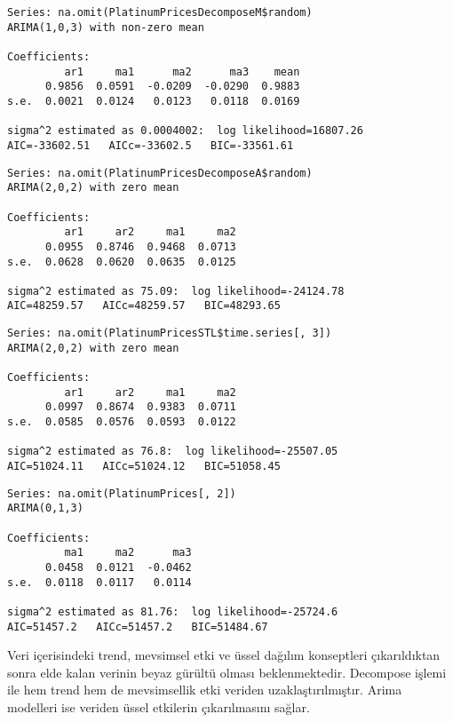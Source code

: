 \documentclass[11pt]{article}
\begin{document}
    
    \begin{verbatim}
Series: na.omit(PlatinumPricesDecomposeM$random) 
ARIMA(1,0,3) with non-zero mean 

Coefficients:
         ar1     ma1      ma2      ma3    mean
      0.9856  0.0591  -0.0209  -0.0290  0.9883
s.e.  0.0021  0.0124   0.0123   0.0118  0.0169

sigma^2 estimated as 0.0004002:  log likelihood=16807.26
AIC=-33602.51   AICc=-33602.5   BIC=-33561.61
    \end{verbatim}

    
    
    \begin{verbatim}
Series: na.omit(PlatinumPricesDecomposeA$random) 
ARIMA(2,0,2) with zero mean 

Coefficients:
         ar1     ar2     ma1     ma2
      0.0955  0.8746  0.9468  0.0713
s.e.  0.0628  0.0620  0.0635  0.0125

sigma^2 estimated as 75.09:  log likelihood=-24124.78
AIC=48259.57   AICc=48259.57   BIC=48293.65
    \end{verbatim}

    
    
    \begin{verbatim}
Series: na.omit(PlatinumPricesSTL$time.series[, 3]) 
ARIMA(2,0,2) with zero mean 

Coefficients:
         ar1     ar2     ma1     ma2
      0.0997  0.8674  0.9383  0.0711
s.e.  0.0585  0.0576  0.0593  0.0122

sigma^2 estimated as 76.8:  log likelihood=-25507.05
AIC=51024.11   AICc=51024.12   BIC=51058.45
    \end{verbatim}

    
    
    \begin{verbatim}
Series: na.omit(PlatinumPrices[, 2]) 
ARIMA(0,1,3) 

Coefficients:
         ma1     ma2      ma3
      0.0458  0.0121  -0.0462
s.e.  0.0118  0.0117   0.0114

sigma^2 estimated as 81.76:  log likelihood=-25724.6
AIC=51457.2   AICc=51457.2   BIC=51484.67
    \end{verbatim}

    
    Veri içerisindeki trend, mevsimsel etki ve üssel dağılım konseptleri
çıkarıldıktan sonra elde kalan verinin beyaz gürültü olması
beklenmektedir. Decompose işlemi ile hem trend hem de mevsimsellik etki
veriden uzaklaştırılmıştır. Arima modelleri ise veriden üssel etkilerin
çıkarılmasını sağlar.
\end{document}
